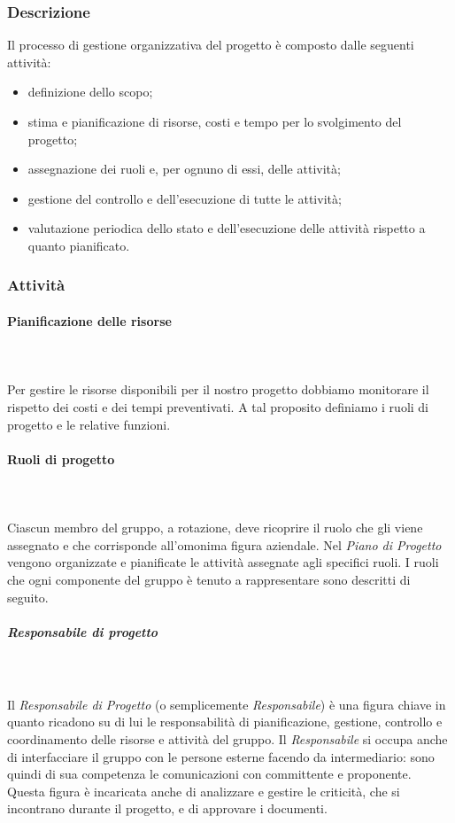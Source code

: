 \subsubsection{Descrizione}
Il processo di gestione organizzativa del progetto è composto dalle seguenti attività: \begin{itemize}
\item definizione dello scopo;
\item stima e pianificazione di risorse, costi e tempo per lo svolgimento del progetto;
\item assegnazione dei ruoli e, per ognuno di essi, delle attività;
\item gestione del controllo e dell’esecuzione di tutte le attività;
\item valutazione periodica dello stato e dell’esecuzione delle attività rispetto a quanto pianificato.
\end{itemize}

\subsubsection{Attività}
\paragraph{Pianificazione delle risorse}\mbox{} \\ \mbox{} \\
Per gestire le risorse disponibili per il nostro progetto dobbiamo monitorare il rispetto dei costi e dei tempi preventivati. A tal proposito definiamo i ruoli di progetto e le relative funzioni.

\paragraph{Ruoli di progetto}\mbox{} \\ \mbox{} \\
Ciascun membro del gruppo, a rotazione, deve ricoprire il ruolo che gli viene assegnato e che corrisponde all'omonima figura aziendale. Nel \textit{Piano di Progetto} vengono organizzate e pianificate le attività assegnate agli specifici ruoli. I ruoli che ogni componente del gruppo è tenuto a rappresentare sono descritti di seguito.

\subparagraph*{Responsabile di progetto}\mbox{} \\ \mbox{} \\
Il \textit{Responsabile di Progetto} (o semplicemente \textit{Responsabile}) è una figura chiave in quanto ricadono su di lui le responsabilità di pianificazione, gestione, controllo e coordinamento delle risorse e attività del gruppo. Il \textit{Responsabile} si occupa anche di interfacciare il gruppo con le persone esterne facendo da intermediario: sono quindi di sua competenza le comunicazioni con committente e proponente.
Questa figura è incaricata anche di analizzare e gestire le criticità, che si incontrano durante il progetto, e di approvare i documenti.

